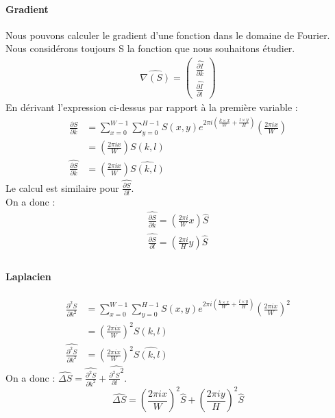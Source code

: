 \paragraph{Gradient}
Nous pouvons calculer le gradient d'une fonction dans le domaine de Fourier. Nous considérons toujours S la fonction que nous souhaitons étudier. 
\begin{equation}
\begin{aligned}
\widehat{\nabla (S)}=
\begin{pmatrix}
\widehat{\frac{\partial I}{\partial k}}\\
\widehat{\frac{\partial I}{\partial l}}
\end{pmatrix}
\end{aligned}
\end{equation}
En dérivant l'expression ci-dessus par rapport à la première variable : 
\begin{equation}
\begin{aligned}
\frac{\partial S}{\partial k} &= \sum_{x = 0}^{W-1} \sum_{y = 0}^{H-1} S(x,y) e^{2\pi i\left(\frac{k\times x}{W}+\frac{l\times y}{H}\right)}\left(\frac{2\pi i x}{W}\right)\\
& = \left(\frac{2\pi i x}{W}\right)S(k,l)\\
\widehat{\frac{\partial S}{\partial k}} &= \left(\frac{2\pi i x}{W}\right)\widehat{S(k,l)}
\end{aligned}
\end{equation}
Le calcul est similaire pour $\widehat{\frac{\partial S}{\partial l}}$.\\
On a donc : 
\begin{equation}
\begin{aligned}
\widehat{\frac{\partial S}{\partial k}} = \left(\frac{2\pi i}{W}x\right) \widehat{S}\\
\widehat{\frac{\partial S}{\partial l}} = \left(\frac{2\pi i}{H}y\right) \widehat{S}\\
\end{aligned}
\end{equation}

\paragraph{Laplacien}
\begin{equation}
\begin{aligned}
\frac{\partial^2 S}{\partial k ^2} & = \sum_{x = 0}^{W-1} \sum_{y = 0}^{H-1} S(x,y) e^{2\pi i\left(\frac{k\times x}{W}+\frac{l\times y}{H}\right)}\left(\frac{2\pi i x}{W}\right)^2\\
& = \left(\frac{2\pi i x}{W}\right)^2 S(k,l)\\
\widehat{\frac{\partial^2 S}{\partial k^2}} &= \left(\frac{2\pi i x}{W}\right)^2\widehat{S(k,l)}
\end{aligned}
\end{equation}
On a donc : 
$\widehat{\Delta S} = \widehat{\frac{\partial^2 S}{\partial k^2}}+ \widehat{\frac{\partial^2 S}{\partial l}^2}$.
\begin{equation}
\widehat{\Delta S} = \left(\frac{2\pi i x}{W}\right)^2 \widehat{S}+\left(\frac{2\pi i y}{H}\right)^2 \widehat{S}
\end{equation}

